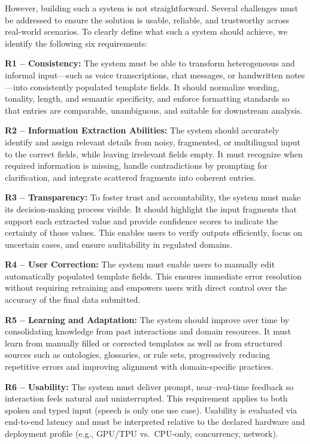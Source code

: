 However, building such a system is not straightforward. Several challenges must be addressed to ensure the solution is usable, reliable, and trustworthy across real-world scenarios. To clearly define what such a system should achieve, we identify the following six requirements:   

\textbf{R1 – Consistency:}  
The system must be able to transform heterogeneous and informal input—such as voice transcriptions, chat messages, or handwritten notes—into consistently populated template fields. It should normalize wording, tonality, length, and semantic specificity, and enforce formatting standards so that entries are comparable, unambiguous, and suitable for downstream analysis.  

\textbf{R2 – Information Extraction Abilities:}  
The system should accurately identify and assign relevant details from noisy, fragmented, or multilingual input to the correct fields, while leaving irrelevant fields empty. It must recognize when required information is missing, handle contradictions by prompting for clarification, and integrate scattered fragments into coherent entries.  

\textbf{R3 – Transparency:}  
To foster trust and accountability, the system must make its decision-making process visible. It should highlight the input fragments that support each extracted value and provide confidence scores to indicate the certainty of those values. This enables users to verify outputs efficiently, focus on uncertain cases, and ensure auditability in regulated domains.  

\textbf{R4 – User Correction:}  
The system must enable users to manually edit automatically populated template fields. This ensures immediate error resolution without requiring retraining and empowers users with direct control over the accuracy of the final data submitted.  

\textbf{R5 – Learning and Adaptation:}  
The system should improve over time by consolidating knowledge from past interactions and domain resources. It must learn from manually filled or corrected templates as well as from structured sources such as ontologies, glossaries, or rule sets, progressively reducing repetitive errors and improving alignment with domain-specific practices.

\textbf{R6 – Usability:}  
The system must deliver prompt, near–real-time feedback so interaction feels natural and uninterrupted. This requirement applies to both spoken and typed input (speech is only one use case). Usability is evaluated via end-to-end latency and must be interpreted relative to the declared hardware and deployment profile (e.g., GPU/TPU vs.\ CPU-only, concurrency, network).

